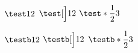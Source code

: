 \documentclass[12pt, a4paper]{article}
\begin{document}
$\test12$
$\test[\Big]12$
$\test*{\dfrac12}3$

$\testb12$
$\testb[\Big]12$
$\testb*{\dfrac12}3$
\end{document}
